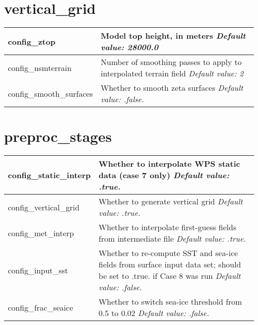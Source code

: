 \section{vertical\_grid}

{\small
\begin{longtable}{|p{1.75in} |p{4.5in}|}
 \hline
   config\_ztop            & Model top height, in meters \newline 
   {\em Default value: 28000.0} \\ \hline
   
   config\_nsmterrain      & Number of smoothing passes to apply to interpolated terrain field \newline 
   {\em Default value: 2} \\ \hline
   
   config\_smooth\_surfaces & Whether to smooth zeta surfaces \newline 
   {\em Default value: .false.} \\ \hline
\end{longtable}
}

\section{preproc\_stages}

{\small
\begin{longtable}{|p{1.5in} |p{4.75in}|}
 \hline 
   config\_static\_interp   & Whether to interpolate WPS static data (case 7 only) \newline 
   {\em Default value: .true.} \\ \hline

   config\_vertical\_grid   & Whether to generate vertical grid \newline 
   {\em Default value: .true.} \\ \hline

   config\_met\_interp      & Whether to interpolate first-guess fields from intermediate file \newline 
   {\em Default value: .true.} \\ \hline
  
   config\_input\_sst       & Whether to re-compute SST and sea-ice fields from surface input data set; should be set to .true. if Case 8 was run \newline 
   {\em Default value: .false.} \\ \hline
    
   config\_frac\_seaice       & Whether to switch sea-ice threshold from 0.5 to 0.02 \newline 
   {\em Default value: .false.} \\ \hline
\end{longtable}
}

